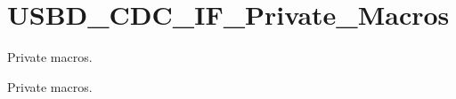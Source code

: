 \hypertarget{group___u_s_b_d___c_d_c___i_f___private___macros}{
\section{USBD\_\-CDC\_\-IF\_\-Private\_\-Macros}
\label{group___u_s_b_d___c_d_c___i_f___private___macros}
}
Private macros.  


Private macros. 